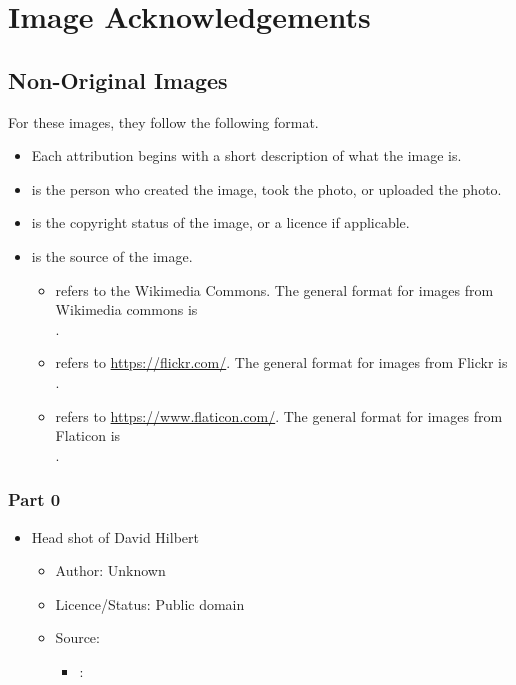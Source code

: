 \chapter{Image Acknowledgements}

\section*{Non-Original Images}
For these images, they follow the following format.
\begin{itemize}
    \item Each attribution begins with a short description of what the image is.
    \item {} is the person who created the image, took the photo, or uploaded the photo.
    \item {} is the copyright status of the image, or a licence if applicable.
    \item {} is the source of the image.
    \begin{itemize}
        \item {} refers to the Wikimedia Commons. The general format for images from Wikimedia commons is \\.
        \item {} refers to \url{https://flickr.com/}. The general format for images from Flickr is \\.
        \item {} refers to \url{https://www.flaticon.com/}. The general format for images from Flaticon is \\.
    \end{itemize}
\end{itemize}

\subsection*{Part 0}
\begin{itemize}
    \item Head shot of David Hilbert
    \begin{itemize}
        \item Author: Unknown
        \item Licence/Status: Public domain
        \item Source: 
        \begin{itemize}
            \item {}: 
        \end{itemize}
    \end{itemize}
\end{itemize}

